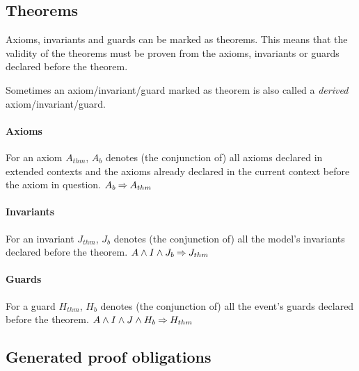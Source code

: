 \subsection{Theorems}
\label{theorems}
Axioms, invariants and guards can be marked as theorems. This means that the validity of the theorems must be proven from the axioms, invariants or guards declared before
  the theorem.

Sometimes an axiom/invariant/guard marked as theorem is also called a \emph{derived} axiom/invariant/guard.

\paragraph{Axioms}
\label{axioms_as_theorems}
For an axiom $A_{thm}$, $A_b$ denotes (the conjunction of) all axioms declared
  in extended contexts and the axioms already declared in
  the current context before the axiom in question.
%
  {$A_b \mathbin\Rightarrow A_{thm}$}

\paragraph{Invariants}
\label{invariants_as_theorems}
For an invariant $J_{thm}$, $J_b$ denotes (the conjunction of) all the model's 
  invariants declared before the theorem.
%
  {$A \land I \land J_b \mathbin\Rightarrow J_{thm}$}

\paragraph{Guards}
\label{guards_as_theorems}
For a guard $H_{thm}$, $H_b$ denotes (the conjunction of) all the event's 
  guards declared before the theorem.
%
  {$A \land I \land J \land H_b \mathbin\Rightarrow H_{thm}$}

\subsection{Generated proof obligations}
\label{generated_proof_obligations}


